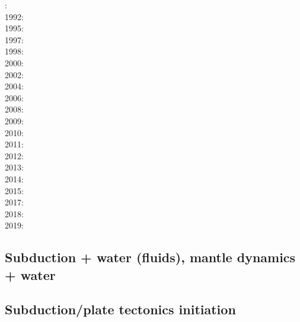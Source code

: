 {\scriptsize
{}: \cite{futo85}\\
1992: \cite{wosp92}\\
1995: \cite{yowo95}\cite{voda95}\cite{davo95}\\
1997: \cite{wowo97}\\
1998: \cite{desw98}\cite{caws98}\\
2000: \cite{wosp00}\\
2002: \cite{bugw02}\\
2004: \cite{geym04}\\
2006: \cite{fabm06}\\
2008: \cite{zlfd08}\\
2009: \cite{anbi09}\cite{bubi09}\cite{vasv09}\\
2010: \cite{bubi10}\cite{bagc10}\cite{hagr10}\\
2011: \cite{dugm11}\cite{vaal11}\cite{schm11}\\
2012: \cite{dugk12}\cite{dusg12}\\
2013: \cite{care13}\cite{mafv13}\cite{ghbu13}\cite{duge13}\cite{lixg13}\\
2014: \cite{dugs14}\cite{besr14}\cite{vosd14}\cite{butm14}\\
2015: \cite{vosc15}\cite{fohk15}\\
2017: \cite{frbm17}\cite{maav17}\\
2018: \cite{garm18}\cite{bezb18}\\
2019: \cite{beml19}\cite{fegb19}
}

\subsection{Subduction + water (fluids), mantle dynamics + water}

{\scriptsize
\noindent
\cite{vakp02}
\cite{abvk06}
\cite{roms10}
\cite{geme11}\cite{vahs11}
\cite{fagm12}
\cite{qubu14}\cite{mabv14}\cite{malg14}\cite{wisv14}
\cite{bomv15}\cite{nani15}
\cite{ceww17}\cite{wewv17}
\cite{ceww19}\cite{meag19}\cite{ligc19}
}

\subsection{Subduction/plate tectonics initiation}

